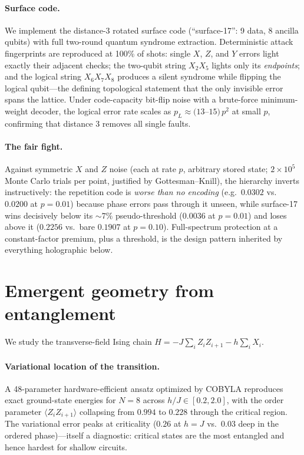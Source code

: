\documentclass[11pt]{article}
\newcommand{\br}[1]{\langle #1 \rangle}
\begin{document}
\paragraph{Surface code.} We implement the distance-3 rotated surface
code (``surface-17'': 9 data, 8 ancilla qubits) with full two-round
quantum syndrome extraction. Deterministic attack fingerprints are
reproduced at 100\% of shots: single $X$, $Z$, and $Y$ errors light
exactly their adjacent checks; the two-qubit string $X_2X_5$ lights only
its \emph{endpoints}; and the logical string $X_6X_7X_8$ produces a
silent syndrome while flipping the logical qubit---the defining
topological statement that the only invisible error spans the lattice.
Under code-capacity bit-flip noise with a brute-force minimum-weight
decoder, the logical error rate scales as $p_L \approx (13$--$15)\,p^2$
at small $p$, confirming that distance 3 removes all single faults.

\paragraph{The fair fight.} Against symmetric $X$ and $Z$ noise
(each at rate $p$, arbitrary stored state; $2\times10^5$ Monte Carlo
trials per point, justified by Gottesman--Knill), the hierarchy inverts
instructively: the repetition code is \emph{worse than no encoding}
(e.g.\ $0.0302$ vs.\ $0.0200$ at $p = 0.01$) because phase errors pass
through it unseen, while surface-17 wins decisively below its
$\sim\!7\%$ pseudo-threshold ($0.0036$ at $p=0.01$) and loses above it
($0.2256$ vs.\ bare $0.1907$ at $p = 0.10$). Full-spectrum protection at
a constant-factor premium, plus a threshold, is the design pattern
inherited by everything holographic below.

\section{Emergent geometry from entanglement}
\label{sec:emergence}

We study the transverse-field Ising chain
$H = -J\sum_i Z_i Z_{i+1} - h \sum_i X_i$.

\paragraph{Variational location of the transition.} A 48-parameter
hardware-efficient ansatz optimized by COBYLA reproduces exact
ground-state energies for $N = 8$ across $h/J \in [0.2, 2.0]$, with the
order parameter $\br{Z_iZ_{i+1}}$ collapsing from $0.994$ to $0.228$
through the critical region. The variational error peaks at criticality
($0.26$ at $h = J$ vs.\ $0.03$ deep in the ordered phase)---itself a
diagnostic: critical states are the most entangled and hence hardest for
shallow circuits.
\end{document}
